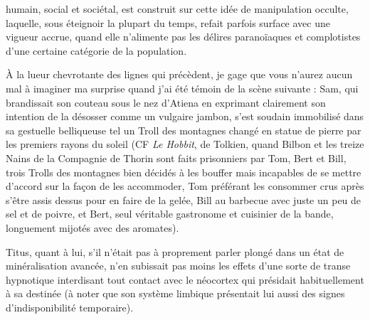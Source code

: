 humain, social et sociétal, est construit sur cette idée de manipulation occulte, laquelle, sous éteignoir la plupart du temps, refait parfois surface avec une vigueur accrue, quand elle n’alimente pas les délires paranoïaques et complotistes d’une certaine catégorie de la population.

À la lueur chevrotante des lignes qui précèdent, je gage que vous n’aurez aucun mal à imaginer ma surprise quand j’ai été témoin de la scène suivante : Sam, qui brandissait son couteau sous le nez d’Atiena en exprimant clairement son intention de la désosser comme un vulgaire jambon, s’est soudain immobilisé dans sa gestuelle belliqueuse tel un Troll des montagnes changé en statue de pierre par les premiers rayons du soleil (CF \textit{Le Hobbit}, de Tolkien, quand Bilbon et les treize Nains de la Compagnie de Thorin sont faits prisonniers par Tom, Bert et Bill, trois Trolls des montagnes bien décidés à les bouffer mais incapables de se mettre d’accord sur la façon de les accommoder, Tom préférant les consommer crus après s’être assis dessus pour en faire de la gelée, Bill au barbecue avec juste un peu de sel et de poivre, et Bert, seul véritable gastronome et cuisinier de la bande, longuement mijotés avec des aromates).

Titus, quant à lui, s’il n’était pas à proprement parler plongé dans un état de minéralisation avancée, n’en subissait pas moins les effets d’une sorte de transe hypnotique interdisant tout contact avec le néocortex qui présidait habituellement à sa destinée (à noter que son système limbique présentait lui aussi des signes d’indisponibilité temporaire).

